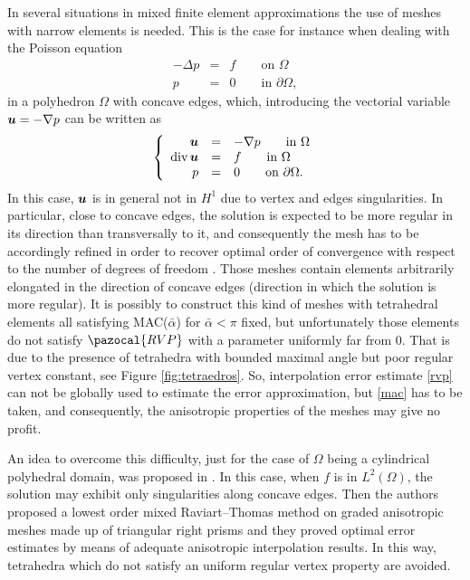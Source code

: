 In several situations in mixed finite element approximations the use of meshes with narrow elements is needed. This is the case for instance when dealing with the Poisson equation 
\begin{eqnarray}\label{ecuacion}
-\Delta p &=& f\qquad \mbox{on }\Omega\\\nonumber p&=&0\qquad \mbox{in }\partial\Omega,
\end{eqnarray}
in a polyhedron $\Omega$ with concave edges, which, introducing the vectorial variable $\boldsymbol{u}=-\nabla p$ can be written as
\begin{equation}\label{mf} \left\{\begin{array}{rcl}
\boldsymbol{u}&=&-\nabla p\qquad \mbox{in }\Omega\\
\mbox{div\,}\boldsymbol{u}&=&f\qquad \mbox{in }\Omega\\
p&=&0\qquad\mbox{on }\partial\Omega.\end{array}\right.
\end{equation}
In this case,  $\boldsymbol{u}$ is in general not in $H^1$ due to vertex and edges 
singularities. In particular, close to concave edges, the solution is expected to be more regular in its direction than 
transversally to it, and consequently the mesh has to be accordingly refined in order to recover optimal order of convergence 
with respect to the number of degrees of freedom 
\cite{alw, apelNicaise}. Those meshes contain elements arbitrarily 
elongated in the direction of concave edges (direction in which the solution is more regular). It is possibly to construct this
kind of meshes with tetrahedral elements all satisfying MAC($\bar\alpha$) for $\bar\alpha<\pi$ fixed, but unfortunately those 
elements do not satisfy $\pazocal{RVP}$ with a parameter uniformly far from $0$. That is 
due to the presence of tetrahedra with bounded 
maximal angle but poor regular vertex constant, see Figure \ref{fig:tetraedros}. So, interpolation error estimate \eqref{rvp} 
can not be globally used to estimate the error approximation, but \eqref{mac} has to be taken, and consequently, 
the anisotropic properties of the meshes may give no profit.  

\tetsTikz

An idea to overcome this difficulty, just for the case of $\Omega$ being a cylindrical polyhedral domain, 
was proposed in \cite{MR1866274}. In  this case, when $f$ is in $L^2(\Omega)$, 
the solution may exhibit only singularities along concave edges.
Then the authors proposed a lowest order mixed Raviart--Thomas method on graded 
anisotropic meshes made up of triangular right prisms and they proved optimal error 
estimates by means of adequate anisotropic interpolation results. 
In this way, tetrahedra which do not satisfy an uniform regular vertex property are avoided. 

